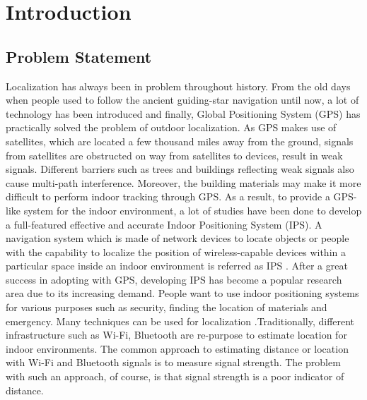 \documentclass[\main/main.tex]{subfiles}
\begin{document}
\graphicspath{{img/}{01_intro/img/}}

\chapter{Introduction}

\section{Problem Statement}
Localization has always been in problem throughout history. From the old days when people used to follow the ancient guiding-star navigation until now, a lot of technology has been introduced and finally, Global Positioning System (GPS) has practically solved the problem of outdoor localization. As GPS makes use of satellites, which are located a few thousand miles away from the ground, signals from satellites are obstructed on way from satellites to devices, result in weak signals. Different barriers such as trees and buildings reflecting weak signals also cause multi-path interference. Moreover, the building materials may make it more difficult to perform indoor tracking through GPS. As a result, to provide a GPS-like system for the indoor environment, a lot of studies have been done to develop a full-featured effective and accurate Indoor Positioning System (IPS).
\newline\newline
A navigation system which is made of network devices to locate objects or people with the capability to localize the position of wireless-capable devices within a particular space inside an indoor environment is referred as IPS \cite{survey_on_indoor_wireless_positioning_techniques}. After a great success in adopting with GPS, developing IPS has become a popular research area due to its increasing demand. People want to use indoor positioning systems for various purposes such as security, finding the location of materials and emergency. 
\newline\newline
Many techniques can be used for localization \cite{a_survey_on_localization_for_mobile_wireless_sensor_networks}.Traditionally, different infrastructure such as Wi-Fi, Bluetooth are re-purpose to estimate location for indoor environments. The common approach to estimating distance or location with Wi-Fi and Bluetooth signals is to measure signal strength. The problem with such an approach, of course, is that signal strength is a poor indicator of distance.
\newline\newline
\end{document}
